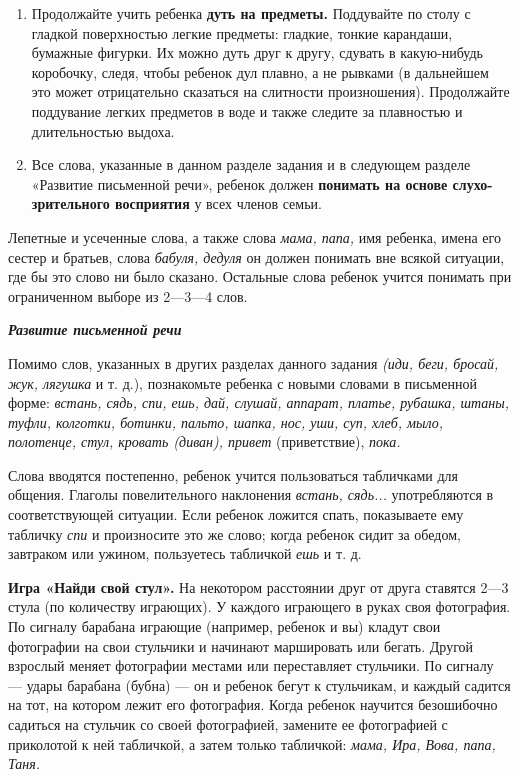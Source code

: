 \documentclass[a5paper]{book}
\renewcommand{\emph}[1]{\textit{#1}}
\begin{document}
\begin{enumerate}
\def\labelenumi{\arabic{enumi}.}
\setcounter{enumi}{3}
\item
  
  Продолжайте учить ребенка \textbf{дуть на предметы.} Поддувайте по
  столу с гладкой поверхностью легкие предметы: гладкие, тонкие
  карандаши, бумажные фигурки. Их можно дуть друг к другу, сдувать в
  какую-нибудь коробочку, следя, чтобы ребенок дул плавно, а не рывками
  (в дальнейшем это может отрицательно сказаться на слитности
  произношения). Продолжайте поддувание легких предметов в воде и также
  следите за плавностью и длительностью выдоха.
  
\item
  
  Все слова, указанные в данном разделе задания и в следующем разделе
  «Развитие письменной речи», ребенок должен \textbf{понимать на основе
  слухо-зрительного восприятия} у всех членов семьи.
  
\end{enumerate}


Лепетные и усеченные слова, а также слова \emph{мама, папа,} имя
ребенка, имена его сестер и братьев, слова \emph{бабуля, дедуля} он
должен понимать вне всякой ситуации, где бы это слово ни было сказано.
Остальные слова ребенок учится понимать при ограниченном выборе из
2---3---4 слов.

\emph{\textbf{Развитие письменной речи}}

Помимо слов, указанных в других разделах данного задания \emph{(иди,
беги, бросай, жук, лягушка} и т. д.), познакомьте ребенка с новыми
словами в письменной форме: \emph{встань, сядь, спи, ешь, дай, слушай,
аппарат, платье, рубашка, штаны, туфли, колготки, ботинки, пальто,
шапка, нос, уши, суп, хлеб, мыло, полотенце, стул, кровать (диван),
привет} (приветствие), \emph{пока.}

Слова вводятся постепенно, ребенок учится пользоваться табличками для
общения. Глаголы повелительного наклонения \emph{встань, сядь...}
употребляются в соответствующей ситуации. Если ребенок ложится спать,
показываете ему табличку \emph{спи} и произносите это же слово; когда
ребенок сидит за обедом, завтраком или ужином, пользуетесь табличкой
\emph{ешь} и т. д.

\textbf{Игра «Найди свой стул».} На некотором расстоянии друг от друга
ставятся 2---3 стула (по количеству играющих). У каждого играющего в
руках своя фотография. По сигналу барабана играющие (например, ребенок и
вы) кладут свои фотографии на свои стульчики и начинают маршировать или
бегать. Другой взрослый меняет фотографии местами или переставляет
стульчики. По сигналу --- удары барабана (бубна) --- он и ребенок бегут
к стульчикам, и каждый садится на тот, на котором лежит его фотография.
Когда ребенок научится безошибочно садиться на стульчик со своей
фотографией, замените ее фотографией с приколотой к ней табличкой, а
затем только табличкой: \emph{мама, Ира, Вова, папа, Таня.}
\end{document}
